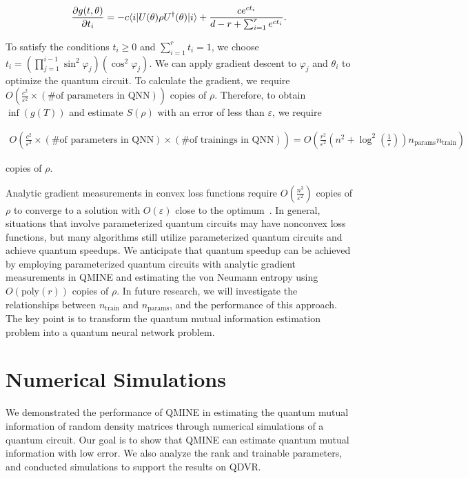 \documentclass[aps,groupedaddress,superscriptaddress,amssymb,amsmath,amsbsy,amsfonts,twocolumn,pra]{revtex4}
\begin{document}
\begin{equation}
\frac{\partial g(t, \theta)}{\partial t_i} = -c\langle i|U(\theta)\rho U^{\dagger}(\theta)|i\rangle + \frac{ce^{ct_i}}{d-r+\sum^r_{i=1} e^{ct_i}}.
\end{equation}

To satisfy the conditions $t_i \geq 0$ and $\sum^r_{i=1} t_i = 1$, we choose $t_i = \left(\prod^{i-1}_{j=1} \sin^2\varphi_j\right)\left(\cos^2\varphi_j\right)$. We can apply gradient descent to $\varphi_j$ and $\theta_i$ to optimize the quantum circuit. To calculate the gradient, we require $O\left(\frac{c^2}{\varepsilon^{2}} \times \left(\text{\# of parameters in QNN}\right)\right)$ copies of $\rho$. Therefore, to obtain $\inf\left(g\left(T\right)\right)$ and estimate $S\left(\rho\right)$ with an error of less than $\varepsilon$, we require

\begin{widetext}
\begin{align}
O\left(\frac{c^2}{\varepsilon^{2}} \times \left(\text{\# of parameters in QNN}\right) \times \left(\text{\# of trainings in QNN}\right)\right) %
= O\left(\frac{r^2}{\varepsilon^2}\left(n^2+\log^2\left(\frac{1}{\varepsilon}\right)\right)n_\text{params}n_\text{train}\right)
\end{align}
\end{widetext}
copies of $\rho$.

Analytic gradient measurements in convex loss functions require $O(\frac{n^3}{\varepsilon^2})$ copies of $\rho$ to converge to a solution with $O(\varepsilon)$ close to the optimum~\cite{HN21}. In general, situations that involve parameterized quantum circuits may have nonconvex loss functions, but many algorithms still utilize parameterized quantum circuits and achieve quantum speedups. We anticipate that quantum speedup can be achieved by employing parameterized quantum circuits with analytic gradient measurements in QMINE and estimating the von Neumann entropy using $O(\text{poly}(r))$ copies of $\rho$. In future research, we will investigate the relationships between $n_\text{train}$ and $n_\text{params}$, and the performance of this approach. The key point is to transform the quantum mutual information estimation problem into a quantum neural network problem.

\section{Numerical Simulations} \label{sec:ns}
We demonstrated the performance of QMINE in estimating the quantum mutual information of random density matrices through numerical simulations of a quantum circuit. Our goal is to show that QMINE can estimate quantum mutual information with low error. We also analyze the rank and trainable parameters, and conducted simulations to support the results on QDVR.
\end{document}
